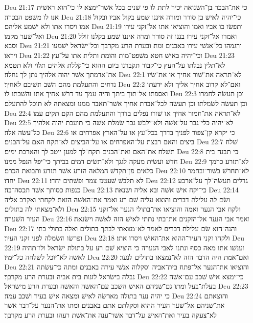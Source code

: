 Deu 21:17  כי את־הבכר בן־השׂנואה יכיר לתת לו פי שׁנים בכל אשׁר־ימצא לו כי־הוא ראשׁית אנו לו משׁפט הבכרה׃
Deu 21:18  כי־יהיה לאישׁ בן סורר ומורה איננו שׁמע בקול אביו ובקול אמו ויסרו אתו ולא ישׁמע אליהם׃
Deu 21:19  ותפשׂו בו אביו ואמו והוציאו אתו אל־זקני עירו ואל־שׁער מקמו׃
Deu 21:20  ואמרו אל־זקני עירו בננו זה סורר ומרה איננו שׁמע בקלנו זולל וסבא׃
Deu 21:21  ורגמהו כל־אנשׁי עירו באבנים ומת ובערת הרע מקרבך וכל־ישׂראל ישׁמעו ויראו׃
Deu 21:22  וכי־יהיה באישׁ חטא משׁפט־מות והומת ותלית אתו על־עץ׃
Deu 21:23  לא־תלין נבלתו על־העץ כי־קבור תקברנו ביום ההוא כי־קללת אלהים תלוי ולא תטמא את־אדמתך אשׁר יהוה אלהיך נתן לך נחלה׃
Deu 22:1  לא־תראה את־שׁור אחיך או את־שׂיו נדחים והתעלמת מהם השׁב תשׁיבם לאחיך׃
Deu 22:2  ואם־לא קרוב אחיך אליך ולא ידעתו ואספתו אל־תוך ביתך והיה עמך עד דרשׁ אחיך אתו והשׁבתו לו׃
Deu 22:3  וכן תעשׂה לחמרו וכן תעשׂה לשׂמלתו וכן תעשׂה לכל־אבדת אחיך אשׁר־תאבד ממנו ומצאתה לא תוכל להתעלם׃
Deu 22:4  לא־תראה את־חמור אחיך או שׁורו נפלים בדרך והתעלמת מהם הקם תקים עמו׃
Deu 22:5  לא־יהיה כלי־גבר על־אשׁה ולא־ילבשׁ גבר שׂמלת אשׁה כי תועבת יהוה אלהיך כל־עשׂה אלה׃
Deu 22:6  כי יקרא קן־צפור לפניך בדרך בכל־עץ או על־הארץ אפרחים או ביצים והאם רבצת על־האפרחים או על־הביצים לא־תקח האם על־הבנים׃
Deu 22:7  שׁלח תשׁלח את־האם ואת־הבנים תקח־לך למען ייטב לך והארכת ימים׃
Deu 22:8  כי תבנה בית חדשׁ ועשׂית מעקה לגגך ולא־תשׂים דמים בביתך כי־יפל הנפל ממנו׃
Deu 22:9  לא־תזרע כרמך כלאים פן־תקדשׁ המלאה הזרע אשׁר תזרע ותבואת הכרם׃
Deu 22:10  לא־תחרשׁ בשׁור־ובחמר יחדו׃
Deu 22:11  לא תלבשׁ שׁעטנז צמר ופשׁתים יחדו׃
Deu 22:12  גדלים תעשׂה־לך על־ארבע כנפות כסותך אשׁר תכסה־בה׃
Deu 22:13  כי־יקח אישׁ אשׁה ובא אליה ושׂנאה׃
Deu 22:14  ושׂם לה עלילת דברים והוצא עליה שׁם רע ואמר את־האשׁה הזאת לקחתי ואקרב אליה ולא־מצאתי לה בתולים׃
Deu 22:15  ולקח אבי הנער ואמה והוציאו את־בתולי הנער אל־זקני העיר השׁערה׃
Deu 22:16  ואמר אבי הנער אל־הזקנים את־בתי נתתי לאישׁ הזה לאשׁה וישׂנאה׃
Deu 22:17  והנה־הוא שׂם עלילת דברים לאמר לא־מצאתי לבתך בתולים ואלה בתולי בתי ופרשׂו השׂמלה לפני זקני העיר׃
Deu 22:18  ולקחו זקני העיר־ההוא את־האישׁ ויסרו אתו׃
Deu 22:19  וענשׁו אתו מאה כסף ונתנו לאבי הנערה כי הוציא שׁם רע על בתולת ישׂראל ולו־תהיה לאשׁה לא־יוכל לשׁלחה כל־ימיו׃
Deu 22:20  ואם־אמת היה הדבר הזה לא־נמצאו בתולים לנער׃
Deu 22:21  והוציאו את־הנער אל־פתח בית־אביה וסקלוה אנשׁי עירה באבנים ומתה כי־עשׂתה נבלה בישׂראל לזנות בית אביה ובערת הרע מקרבך׃
Deu 22:22  כי־ימצא אישׁ שׁכב עם־אשׁה בעלת־בעל ומתו גם־שׁניהם האישׁ השׁכב עם־האשׁה והאשׁה ובערת הרע מישׂראל׃
Deu 22:23  כי יהיה נער בתולה מארשׂה לאישׁ ומצאה אישׁ בעיר ושׁכב עמה׃
Deu 22:24  והוצאתם את־שׁניהם אל־שׁער העיר ההוא וסקלתם אתם באבנים ומתו את־הנער על־דבר אשׁר לא־צעקה בעיר ואת־האישׁ על־דבר אשׁר־ענה את־אשׁת רעהו ובערת הרע מקרבך׃
